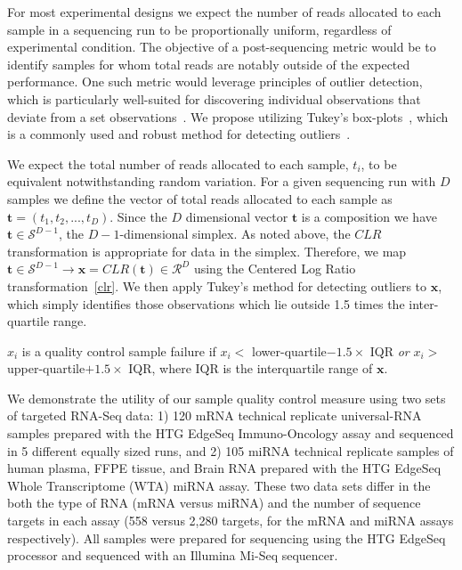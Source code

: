 For most experimental designs we expect the number of reads allocated to each sample in a sequencing run to be proportionally uniform, regardless of experimental condition.  The objective of a post-sequencing metric would be to identify samples for whom total reads are notably outside of the expected performance.  One such metric would leverage principles of outlier detection, which is particularly well-suited for discovering individual observations that deviate from a set observations~\cite{Hawkins1980}.  We propose utilizing Tukey's box-plots~\cite{Tukey1977}, which is a commonly used and robust method for detecting outliers~\cite{Ben-Gal2009}.

We expect the total number of reads allocated to each sample, $t_i$, to be equivalent notwithstanding random variation. For a given sequencing run with $D$ samples we define the vector of total reads allocated to each sample as $\mathbf{t} = (t_1, t_2, ..., t_D)$.  Since the $D$ dimensional vector $\mathbf{t}$ is a composition we have $\mathbf{t} \in \mathcal{S}^{D-1}$, the $D-1$-dimensional simplex. As noted above, the $CLR$ transformation is  appropriate for data in the simplex.  Therefore, we map $\mathbf{t} \in \mathcal{S}^{D-1} \rightarrow \mathbf{x} = CLR(\mathbf{t}) \in \mathcal{R}^D$ using the Centered Log Ratio transformation~\ref{clr}.  We then apply Tukey's method for detecting outliers to $\mathbf{x}$, which simply identifies those observations which lie outside 1.5 times the inter-quartile range.

\theoremstyle{definition}
\begin{definition}
$x_i$ is a quality control sample failure if $x_i <$ lower-quartile$- 1.5 \times$ IQR \emph{or}  $x_i >$ upper-quartile$+ 1.5 \times$ IQR, where IQR is the interquartile range of $\mathbf{x}$.
\end{definition}

We demonstrate the utility of our sample quality control measure using two sets of targeted RNA-Seq data: 1) 120 mRNA technical replicate universal-RNA samples prepared with the HTG EdgeSeq Immuno-Oncology assay and sequenced in 5 different equally sized runs, and 2) 105 miRNA technical replicate samples of human plasma, FFPE tissue, and Brain RNA prepared with the HTG EdgeSeq Whole Transcriptome (WTA) miRNA assay.  These two data sets differ in the both the type of RNA (mRNA versus miRNA) and the number of sequence targets in each assay (558 versus 2,280 targets, for the mRNA and miRNA assays respectively).  All samples were prepared for sequencing using the HTG EdgeSeq processor and sequenced with an Illumina Mi-Seq sequencer.

